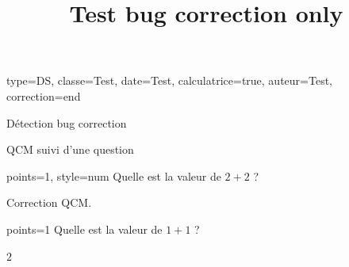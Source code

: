 \documentclass{nfdevoirs}
\title{Test bug correction only}
\begin{document}
\begin{devoir}{
    type=DS,
    classe={Test},
    date={Test},
    calculatrice=true,
    auteur={Test},
    correction=end
}

\begin{partie}{Détection bug correction}

    \begin{exercice}{QCM suivi d'une question}

        \begin{qcm}{points=1, style=num}
            Quelle est la valeur de $2+2$ ?
            \begin{choix}
            \end{choix}
        \end{qcm}

        \begin{correction}
            Correction QCM.
        \end{correction}

        \begin{question}{points=1}
            Quelle est la valeur de $1+1$ ?
        \end{question}

        \begin{correction}
            $2$
        \end{correction}

    \end{exercice}

\end{partie}

\end{devoir}
\end{document}
